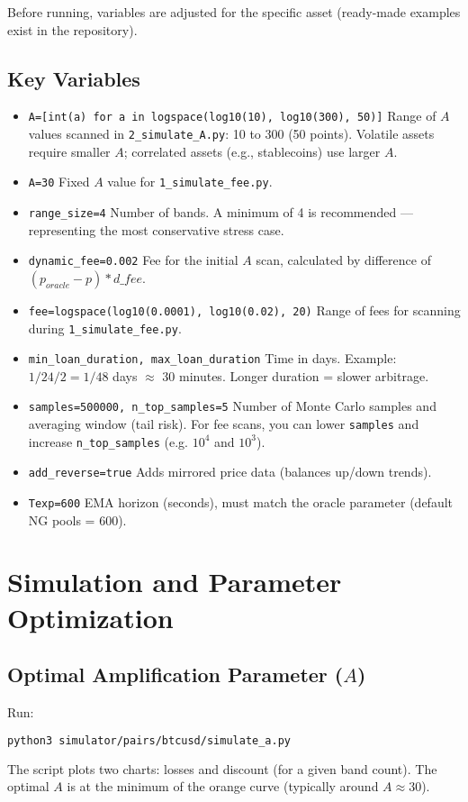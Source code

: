 \documentclass[notitlepage]{revtex4-2}
\begin{document}
Before running, variables are adjusted for the specific asset (ready-made examples exist in the repository).

\subsection*{Key Variables}
\begin{itemize}
  \item \texttt{A=[int(a) for a in logspace(log10(10), log10(300), 50)]} Range of $A$ values scanned in \texttt{2\_simulate\_A.py}: 10 to 300 (50 points). Volatile assets require smaller $A$; correlated assets (e.g., stablecoins) use larger $A$.
  \item \texttt{A=30} Fixed $A$ value for \texttt{1\_simulate\_fee.py}.
  \item \texttt{range\_size=4} Number of bands. A minimum of 4 is recommended — representing the most conservative stress case.
  \item \texttt{dynamic\_fee=0.002} Fee for the initial $A$ scan, calculated by difference of \((p_{oracle}-p)*d\_fee\).
  \item \texttt{fee=logspace(log10(0.0001), log10(0.02), 20)} Range of fees for scanning during \texttt{1\_simulate\_fee.py}.
  \item \texttt{min\_loan\_duration, max\_loan\_duration} Time in days. Example: $1/24/2=1/48$ days $\approx$ 30 minutes. Longer duration = slower arbitrage.
  \item \texttt{samples=500000, n\_top\_samples=5} Number of Monte Carlo samples and averaging window (tail risk). For fee scans, you can lower \texttt{samples} and increase \texttt{n\_top\_samples} (e.g. $10^4$ and $10^3$).
  \item \texttt{add\_reverse=true} Adds mirrored price data (balances up/down trends).
  \item \texttt{Texp=600} EMA horizon (seconds), must match the oracle parameter (default NG pools = 600).
\end{itemize}

\section{Simulation and Parameter Optimization}
\subsection{Optimal Amplification Parameter ($A$)}
Run:
\begin{lstlisting}[language=bash]
python3 simulator/pairs/btcusd/simulate_a.py
\end{lstlisting}
The script plots two charts: losses and discount (for a given band count). The optimal $A$ is at the minimum of the
orange curve (typically around $A\approx30$).
\end{document}
